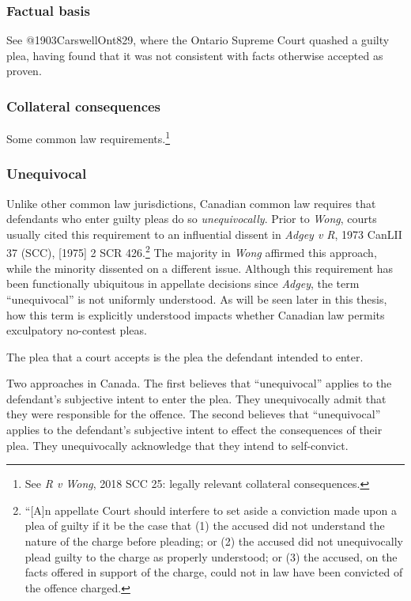 \subsubsection{Factual basis}

See @1903CarswellOnt829, where the Ontario Supreme Court quashed a guilty plea, having found that it was not consistent with facts otherwise accepted as proven.

\subsubsection{Collateral consequences}



Some common law requirements.\footnote{See \textit{R v Wong}, 2018 SCC 25: legally relevant collateral consequences.}

\subsubsection{Unequivocal}

Unlike other common law jurisdictions, Canadian common law requires that defendants who enter guilty pleas do so \textit{unequivocally}. Prior to \textit{Wong}, courts usually cited this requirement to an influential dissent in \textit{Adgey v R}, 1973 CanLII 37 (SCC), [1975] 2 SCR 426.\footnote{``[A]n appellate Court should interfere to set aside a conviction made upon a plea of guilty if it be the case that (1) the accused did not understand the nature of the charge before pleading; or (2) the accused did not unequivocally plead guilty to the charge as properly understood; or (3) the accused, on the facts offered in support of the charge, could not in law have been convicted of the offence charged.} The majority in \textit{Wong} affirmed this approach, while the minority dissented on a different issue. Although this requirement has been functionally ubiquitous in appellate decisions since \textit{Adgey}, the term ``unequivocal'' is not uniformly understood. As will be seen later in this thesis, how this term is explicitly understood impacts whether Canadian law permits exculpatory no-contest pleas.

The plea that a court accepts is the plea the defendant intended to enter.

Two approaches in Canada. The first believes that ``unequivocal'' applies to the defendant's subjective intent to enter the plea. They unequivocally admit that they were responsible for the offence. The second believes that ``unequivocal'' applies to the defendant's subjective intent to effect the consequences of their plea. They unequivocally acknowledge that they intend to self-convict.

